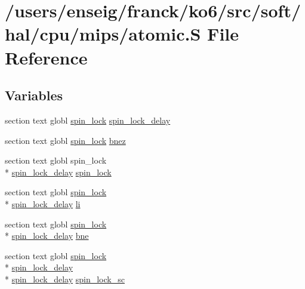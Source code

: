 \hypertarget{mips_2atomic_8S}{\section{/users/enseig/franck/ko6/src/soft/hal/cpu/mips/atomic.S File Reference}
\label{mips_2atomic_8S}
}
\subsection*{Variables}
\begin{DoxyCompactItemize}
\item 
section text globl \hyperlink{atomic_8h_a92a25e1136e165cc5472d68e3901e364}{spin\-\_\-lock} \hyperlink{mips_2atomic_8S_ac58f8c5ceac726ecc3bcc7f0360b5cfa}{spin\-\_\-lock\-\_\-delay}
\item 
section text globl \hyperlink{atomic_8h_a92a25e1136e165cc5472d68e3901e364}{spin\-\_\-lock} \hyperlink{mips_2atomic_8S_ac90faece1c7b2fe2dcf10741e4322281}{bnez}
\item 
section text globl spin\-\_\-lock \\*
\hyperlink{riscv_2atomic_8S_ac58f8c5ceac726ecc3bcc7f0360b5cfa}{spin\-\_\-lock\-\_\-delay} \hyperlink{mips_2atomic_8S_abff7230a2ee820f538a2574ee5b3a593}{spin\-\_\-lock}
\item 
section text globl \hyperlink{atomic_8h_a92a25e1136e165cc5472d68e3901e364}{spin\-\_\-lock} \\*
\hyperlink{riscv_2atomic_8S_ac58f8c5ceac726ecc3bcc7f0360b5cfa}{spin\-\_\-lock\-\_\-delay} \hyperlink{mips_2atomic_8S_acbf877530fdc34fc0b39616c59070e69}{li}
\item 
section text globl \hyperlink{atomic_8h_a92a25e1136e165cc5472d68e3901e364}{spin\-\_\-lock} \\*
\hyperlink{riscv_2atomic_8S_ac58f8c5ceac726ecc3bcc7f0360b5cfa}{spin\-\_\-lock\-\_\-delay} \hyperlink{mips_2atomic_8S_a9ec95c7fd8fc070fa2890d194d38af79}{bne}
\item 
section text globl \hyperlink{atomic_8h_a92a25e1136e165cc5472d68e3901e364}{spin\-\_\-lock} \\*
\hyperlink{riscv_2atomic_8S_ac58f8c5ceac726ecc3bcc7f0360b5cfa}{spin\-\_\-lock\-\_\-delay} \\*
\hyperlink{riscv_2atomic_8S_ac58f8c5ceac726ecc3bcc7f0360b5cfa}{spin\-\_\-lock\-\_\-delay} \hyperlink{mips_2atomic_8S_a7a7f51dd8dea9bb1a88d2d7fd5e793f2}{spin\-\_\-lock\-\_\-sc}
\item 

\end{DoxyCompactItemize}
